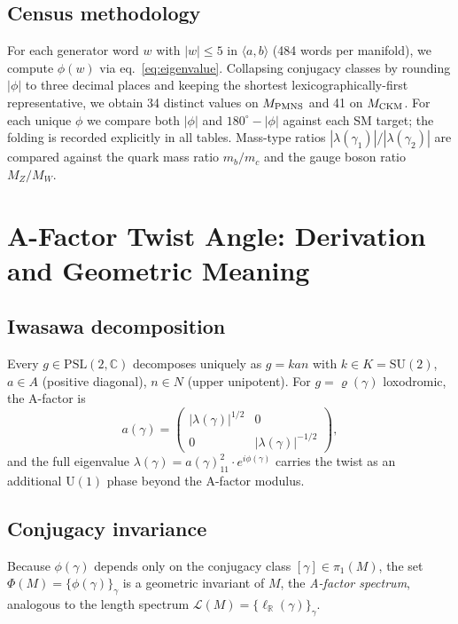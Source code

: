 \documentclass[a4paper,11pt]{article}
\newcommand{\PSL}{\mathrm{PSL}(2,\mathbb{C})}
\newcommand{\pioneM}{\pi_1(M)}
\newcommand{\degr}{^{\circ}}
\begin{document}
\subsection{Census methodology}

For each generator word $w$ with $|w|\leq 5$ in $\langle a,b\rangle$ (484 words per manifold),
we compute $\phi(w)$ via eq.~\eqref{eq:eigenvalue}.
Collapsing conjugacy classes by rounding $|\phi|$ to three decimal places and
keeping the shortest lexicographically-first representative, we obtain
34 distinct values on $M_{\rm PMNS}$ and 41 on $M_{\rm CKM}$.
For each unique $\phi$ we compare both $|\phi|$ and $180\degr-|\phi|$
against each SM target; the folding is recorded explicitly in all tables.
Mass-type ratios $|\lambda(\gamma_1)|/|\lambda(\gamma_2)|$ are compared against
the quark mass ratio $m_b/m_c$ and the gauge boson ratio $M_Z/M_W$.

\section{A-Factor Twist Angle: Derivation and Geometric Meaning}
\label{sec:derivation}

\subsection{Iwasawa decomposition}

Every $g\in\PSL$ decomposes uniquely as $g=kan$ with
$k\in K=\mathrm{SU}(2)$, $a\in A$ (positive diagonal), $n\in N$ (upper
unipotent).
For $g=\varrho(\gamma)$ loxodromic, the A-factor is
\begin{equation}
  a(\gamma) =
  \begin{pmatrix}|\lambda(\gamma)|^{1/2}&0\\0&|\lambda(\gamma)|^{-1/2}\end{pmatrix},
\end{equation}
and the full eigenvalue $\lambda(\gamma)=a(\gamma)_{\!11}^2\cdot e^{i\phi(\gamma)}$
carries the twist as an additional $\mathrm{U}(1)$ phase beyond the A-factor modulus.

\subsection{Conjugacy invariance}

Because $\phi(\gamma)$ depends only on the conjugacy class $[\gamma]\in\pioneM$,
the set $\Phi(M)=\{\phi(\gamma)\}_\gamma$ is a geometric invariant of $M$,
the \emph{A-factor spectrum}, analogous to the length spectrum
$\mathcal{L}(M)=\{\ell_{\mathbb{R}}(\gamma)\}_\gamma$.
\end{document}
